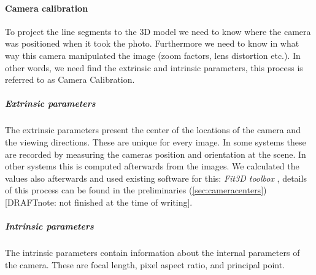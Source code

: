 %  
%  







	\paragraph{Camera calibration}
	To project the line segments to the 3D model we need to know where the
	camera was positioned when it took the photo. Furthermore we need to know
	in what way this camera manipulated the image (zoom factors, lens distortion
	etc.).  In other words, we need find the extrinsic and intrinsic parameters,
	this process is referred to as Camera Calibration.

	\subparagraph{Extrinsic parameters}
	The extrinsic parameters present the center of the locations of the camera
	and the viewing directions. These are unique for every image.
	In some systems these are recorded by measuring the cameras position and
	orientation at the scene. In other systems this is computed afterwards from the images.  
	We calculated the values also afterwards and used existing software for
	this: \emph{Fit3D toolbox} \cite{Fit3d}, details of this process can be
	found in the preliminaries (\ref{sec:cameracenters}) [DRAFTnote: not
	finished at the time of writing].\\  

	\subparagraph{Intrinsic parameters}
	The intrinsic parameters contain information about the internal parameters
	of the camera.  These are focal length, pixel aspect ratio, and principal point.


